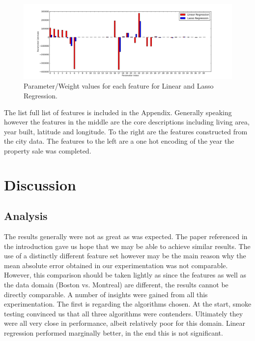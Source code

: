 \documentclass{acm_proc_article-sp}
\begin{document}
	 \begin{figure}[!htbp]
   		\centering
  		\includegraphics[width=\textwidth]{parameter_values.png}
    		\caption{Parameter/Weight values for each feature for Linear and Lasso Regression.}
    		\label{fig:feats}
	\end{figure}
	
	The list full list of features is included in the Appendix. Generally speaking however the features in the middle are the core descriptions including living area, year built, latitude and longitude. To the right are the features constructed from the city data. The features to the left are a one hot encoding of the year the property sale was completed.

\section{Discussion}

\subsection{Analysis} %
	The results generally were not as great as was expected. The paper referenced in the introduction \cite{bostonres} gave us hope that we may be able to achieve similar results. The use of a distinctly different feature set however may be the main reason why the mean absolute error obtained in our experimentation was not comparable. However, this comparison should be taken lightly as since the features as well as the data domain (Boston vs. Montreal) are different, the results cannot be directly comparable. A number of insights were gained from all this experimentation. The first is regarding the algorithms chosen. At the start, smoke testing convinced us that all three algorithms were contenders. Ultimately they were all very close in performance, albeit relatively poor for this domain. Linear regression performed marginally better, in the end this is not significant.
	
\end{document}
